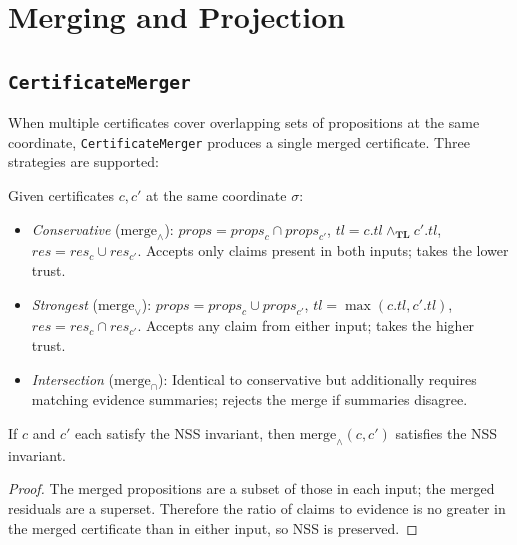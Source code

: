 \documentclass[11pt]{article}
\newcommand{\certprops}{\mathit{props}}        %
\newcommand{\certtrust}{\mathit{tl}}           %
\newcommand{\certresid}{\mathit{res}}          %
\newcommand{\TL}{\mathbf{TL}}                  %
\newcommand{\tlmin}{\wedge_{\TL}}             %
\renewcommand{\merge}{\mathrm{merge}}            %
\begin{document}
\section{Merging and Projection}\label{sec:merge}

\subsection{\texttt{CertificateMerger}}

When multiple certificates cover overlapping sets of propositions at
the same coordinate, \texttt{CertificateMerger} produces a single
merged certificate.  Three strategies are supported:

\begin{definition}\label{def:merge}
Given certificates $c, c'$ at the same coordinate $\sigma$:
\begin{itemize}
  \item \emph{Conservative} ($\merge_{\wedge}$):
        $\certprops = \certprops_c \cap \certprops_{c'}$,
        $\certtrust = c.\certtrust \tlmin c'.\certtrust$,
        $\certresid = \certresid_c \cup \certresid_{c'}$.
        Accepts only claims present in both inputs; takes the lower trust.
  \item \emph{Strongest} ($\merge_{\vee}$):
        $\certprops = \certprops_c \cup \certprops_{c'}$,
        $\certtrust = \max(c.\certtrust, c'.\certtrust)$,
        $\certresid = \certresid_c \cap \certresid_{c'}$.
        Accepts any claim from either input; takes the higher trust.
  \item \emph{Intersection} ($\merge_{\cap}$):
        Identical to conservative but additionally requires matching
        evidence summaries; rejects the merge if summaries disagree.
\end{itemize}
\end{definition}

\begin{proposition}\label{prop:merge-nss}
If $c$ and $c'$ each satisfy the NSS invariant, then
$\merge_{\wedge}(c,c')$ satisfies the NSS invariant.
\end{proposition}
\begin{proof}
The merged propositions are a subset of those in each input; the merged
residuals are a superset.  Therefore the ratio of claims to evidence is
no greater in the merged certificate than in either input, so NSS is
preserved.
\end{proof}
\end{document}
